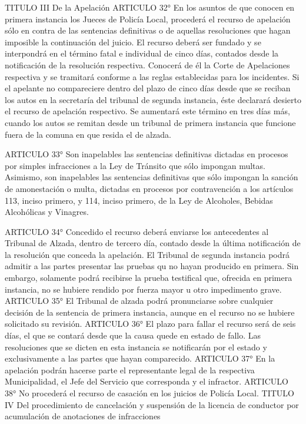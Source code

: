     TITULO III
    De la Apelación
    ARTICULO 32° En los asuntos de que conocen en primera instancia los Jueces de Policía Local, procederá el recurso de apelación sólo en contra de las sentencias definitivas o de aquellas resoluciones que hagan imposible la continuación del juicio. El recurso deberá ser fundado y se interpondrá en el término fatal e individual de cinco días, contados desde la notificación de la resolución respectiva.
    Conocerá de él la Corte de Apelaciones respectiva y se tramitará conforme a las reglas establecidas para los incidentes.
    Si el apelante no compareciere dentro del plazo de cinco días desde que se reciban los autos en la secretaría del tribunal de segunda instancia, éste declarará desierto el recurso de apelación respectivo.
    Se aumentará este término en tres días más, cuando los autos se remitan desde un tribunal de primera instancia que funcione fuera de la comuna en que resida el de alzada.

    ARTICULO 33° Son inapelables las sentencias definitivas dictadas en procesos por simples infracciones a la Ley de Tránsito que sólo impongan multas.
    Asimismo, son inapelables las sentencias definitivas que sólo impongan la sanción de amonestación o multa, dictadas en procesos por contravención a los artículos 113, inciso primero, y 114, inciso primero, de la Ley de Alcoholes, Bebidas Alcohólicas y Vinagres.

    ARTICULO 34° Concedido el recurso deberá enviarse los antecedentes al Tribunal de Alzada, dentro de tercero día, contado desde la última notificación de la resolución que conceda la apelación.
    El Tribunal de segunda instancia podrá admitir a las partes presentar las pruebas qu no hayan producido en primera. Sin embargo, solamente podrá recibirse la prueba testifical que, ofrecida en primera instancia, no se hubiere rendido por fuerza mayor u otro impedimento grave.
    ARTICULO 35° El Tribunal de alzada podrá pronunciarse sobre cualquier decisión de la sentencia de primera instancia, aunque en el recurso no se hubiere solicitado su revisión.
    ARTICULO 36° El plazo para fallar el recurso será de seis días, el que se contará desde que la causa quede en estado de fallo.
    Las resoluciones que se dicten en esta instancia se notificarán por el estado y exclusivamente a las partes que hayan comparecido.
    ARTICULO 37° En la apelación podrán hacerse parte el representante legal de la respectiva Municipalidad, el Jefe del Servicio que corresponda y el infractor.
    ARTICULO 38° No procederá el recurso de casación en los juicios de Policía Local.
    TITULO IV
    Del procedimiento de cancelación y suspensión de la licencia de conductor por acumulación de anotaciones de  infracciones



